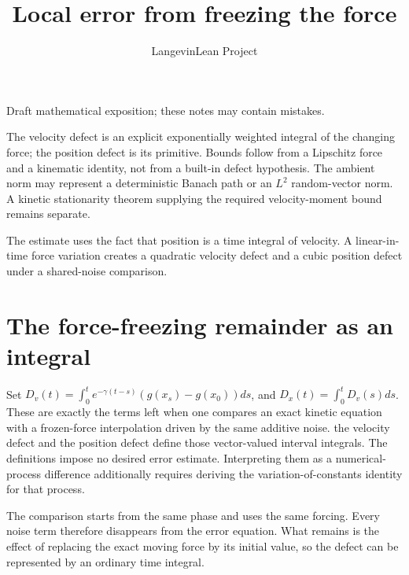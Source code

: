 \documentclass[11pt,a4paper]{article}
\title{\texorpdfstring{Local error from freezing the force}{Local error from freezing the force}}
\author{LangevinLean Project}
\date{}
\begin{document}
\maketitle
Draft mathematical exposition; these notes may contain mistakes.


The velocity defect is an explicit exponentially weighted integral of the changing force; the position defect is its primitive. Bounds follow from a Lipschitz force and a kinematic identity, not from a built-in defect hypothesis. The ambient norm may represent a deterministic Banach path or an \(L^{2}\) random-vector norm. A kinetic stationarity theorem supplying the required velocity-moment bound remains separate.



The estimate uses the fact that position is a time integral of velocity. A linear-in-time force variation creates a quadratic velocity defect and a cubic position defect under a shared-noise comparison.


\section{\texorpdfstring{The force-freezing remainder as an integral}{The force-freezing remainder as an integral}}


Set \(D_v(t)=\int_0^te^{-\gamma(t-s)}(g(x_s)-g(x_0))ds\), and \(D_x(t)=\int_0^tD_v(s)ds\). These are exactly the terms left when one compares an exact kinetic equation with a frozen-force interpolation driven by the same additive noise. the velocity defect and the position defect define those vector-valued interval integrals. The definitions impose no desired error estimate. Interpreting them as a numerical-process difference additionally requires deriving the variation-of-constants identity for that process.



The comparison starts from the same phase and uses the same forcing. Every noise term therefore disappears from the error equation. What remains is the effect of replacing the exact moving force by its initial value, so the defect can be represented by an ordinary time integral.
\end{document}
